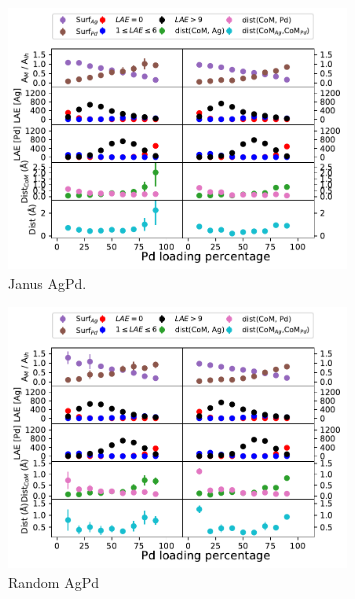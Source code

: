 \begin{figure}
    \centering
    \includegraphics[width=0.8\textwidth]{figures/MD/Alloys/Janus_Ag-Pd.pdf}
    \caption{Janus AgPd.}
    \label{fig:AgPdJan_Dyn}
\end{figure}

\begin{figure}
    \centering
    \includegraphics[width=0.8\textwidth]{figures/MD/Alloys/Random_Ag-Pd.pdf}
    \caption{Random AgPd}
    \label{fig:AgPdRnd_Dyn}
\end{figure}

